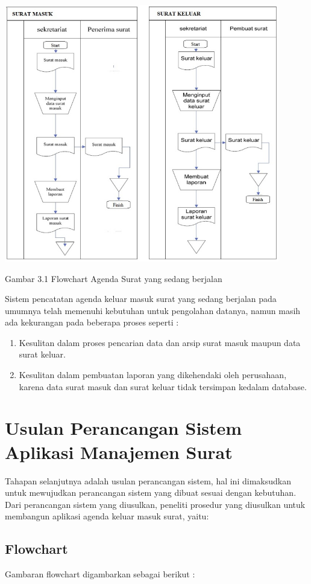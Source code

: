\documentclass{jtetiproposalskripsi}
\begin{document}
\includegraphics[width=12cm]{gambar/FlowchartAMSberjalan.png} 

Gambar 3.1 Flowchart Agenda Surat yang sedang berjalan


Sistem pencatatan agenda keluar masuk surat yang sedang berjalan pada umumnya telah memenuhi kebutuhan untuk pengolahan datanya, namun masih ada kekurangan pada beberapa proses seperti :
\begin{enumerate}
\item Kesulitan dalam proses pencarian data dan arsip surat masuk maupun data surat keluar.
\item Kesulitan dalam pembuatan laporan yang dikehendaki oleh perusahaan, karena data surat masuk dan surat keluar tidak tersimpan kedalam database.
\end{enumerate}

\section{Usulan Perancangan Sistem Aplikasi Manajemen Surat}
Tahapan selanjutnya adalah usulan perancangan sistem, hal ini dimaksudkan untuk mewujudkan perancangan sistem yang dibuat sesuai dengan kebutuhan.
Dari perancangan sistem yang diusulkan, peneliti prosedur yang diusulkan untuk membangun aplikasi agenda keluar masuk surat, yaitu:
\subsection{Flowchart}
Gambaran flowchart digambarkan sebagai berikut :
\end{document}
